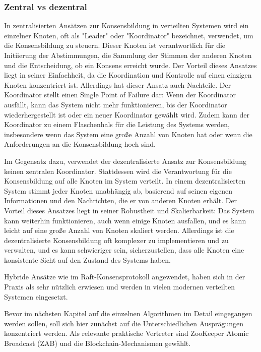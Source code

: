 \subsubsection{Zentral vs dezentral}

In zentralisierten Ansätzen zur Konsensbildung in verteilten Systemen wird ein einzelner Knoten, oft als "Leader" oder "Koordinator" bezeichnet, verwendet, um die Konsensbildung zu steuern. Dieser Knoten ist verantwortlich für die Initiierung der Abstimmungen, die Sammlung der Stimmen der anderen Knoten und die Entscheidung, ob ein Konsens erreicht wurde. Der Vorteil dieses Ansatzes liegt in seiner Einfachheit, da die Koordination und Kontrolle auf einen einzigen Knoten konzentriert ist. Allerdings hat dieser Ansatz auch Nachteile. Der Koordinator stellt einen Single Point of Failure dar: Wenn der Koordinator ausfällt, kann das System nicht mehr funktionieren, bis der Koordinator wiederhergestellt ist oder ein neuer Koordinator gewählt wird. Zudem kann der Koordinator zu einem Flaschenhals für die Leistung des Systems werden, insbesondere wenn das System eine große Anzahl von Knoten hat oder wenn die Anforderungen an die Konsensbildung hoch sind.

Im Gegensatz dazu, verwendet der dezentralisierte Ansatz zur Konsensbildung keinen zentralen Koordinator. Stattdessen wird die Verantwortung für die Konsensbildung auf alle Knoten im System verteilt. In einem dezentralisierten System stimmt jeder Knoten unabhängig ab, basierend auf seinen eigenen Informationen und den Nachrichten, die er von anderen Knoten erhält. Der Vorteil dieses Ansatzes liegt in seiner Robustheit und Skalierbarkeit: Das System kann weiterhin funktionieren, auch wenn einige Knoten ausfallen, und es kann leicht auf eine große Anzahl von Knoten skaliert werden. Allerdings ist die dezentralisierte Konsensbildung oft komplexer zu implementieren und zu verwalten, und es kann schwieriger sein, sicherzustellen, dass alle Knoten eine konsistente Sicht auf den Zustand des Systems haben.

Hybride Ansätze wie im Raft-Konsensprotokoll angewendet, haben sich in der Praxis als sehr nützlich erwiesen und werden in vielen modernen verteilten Systemen eingesetzt.

Bevor im nächsten Kapitel auf die einzelnen Algorithmen im Detail eingegangen werden sollen, soll sich hier zunächst auf die Unterschiedlichen Ausprägungen konzentriert werden. Als relevante praktische Vertreter sind ZooKeeper Atomic Broadcast (ZAB) und die Blockchain-Mechanismen gewählt.

